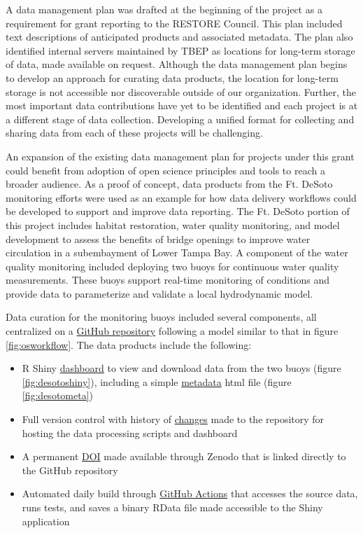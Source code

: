 \documentclass[
]{book}
\providecommand{\tightlist}{%
  \setlength{\itemsep}{0pt}\setlength{\parskip}{0pt}}
\begin{document}
A data management plan was drafted at the beginning of the project as a requirement for grant reporting to the RESTORE Council. This plan included text descriptions of anticipated products and associated metadata. The plan also identified internal servers maintained by TBEP as locations for long-term storage of data, made available on request. Although the data management plan begins to develop an approach for curating data products, the location for long-term storage is not accessible nor discoverable outside of our organization. Further, the most important data contributions have yet to be identified and each project is at a different stage of data collection. Developing a unified format for collecting and sharing data from each of these projects will be challenging.

An expansion of the existing data management plan for projects under this grant could benefit from adoption of open science principles and tools to reach a broader audience. As a proof of concept, data products from the Ft. DeSoto monitoring efforts were used as an example for how data delivery workflows could be developed to support and improve data reporting. The Ft. DeSoto portion of this project includes habitat restoration, water quality monitoring, and model development to assess the benefits of bridge openings to improve water circulation in a subembayment of Lower Tampa Bay. A component of the water quality monitoring included deploying two buoys for continuous water quality measurements. These buoys support real-time monitoring of conditions and provide data to parameterize and validate a local hydrodynamic model.

Data curation for the monitoring buoys included several components, all centralized on a \href{https://github.com/tbep-tech/desoto-buoy}{GitHub repository} following a model similar to that in figure \ref{fig:osworkflow}. The data products include the following:

\begin{itemize}
\tightlist
\item
  R Shiny \href{https://github.com/tbep-tech/desoto-buoy}{dashboard} to view and download data from the two buoys (figure \ref{fig:desotoshiny}), including a simple \href{https://shiny.tbep.org/desoto-buoy/\#section-metadata}{metadata} html file (figure \ref{fig:desotometa})
\item
  Full version control with history of \href{https://github.com/tbep-tech/desoto-buoy/commits/master}{changes} made to the repository for hosting the data processing scripts and dashboard
\item
  A permanent \href{https://zenodo.org/record/3941719\#.YFM9069KiUk}{DOI} made available through Zenodo that is linked directly to the GitHub repository
\item
  Automated daily build through \href{https://github.com/tbep-tech/desoto-buoy/actions}{GitHub Actions} that accesses the source data, runs tests, and saves a binary RData file made accessible to the Shiny application
\end{itemize}
\end{document}
